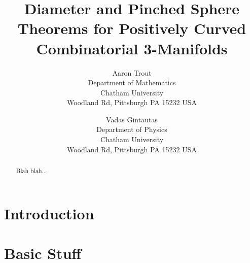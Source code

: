 \documentclass[12pt]{article}
\begin{document}
\nocite{*}

\title{Diameter and Pinched Sphere Theorems for Positively Curved Combinatorial 3-Manifolds}

\author{Aaron Trout \\ Department of Mathematics \\
Chatham University \\ Woodland Rd, Pittsburgh PA 15232 USA \and
Vadas Gintautas\\ Department of Physics \\
Chatham University \\ Woodland Rd, Pittsburgh PA 15232 USA}


\maketitle

\begin{abstract}
  Blah blah...
\end{abstract}


\section{Introduction}


\section{Basic Stuff}
\label{sect:basics}





\end{document}
